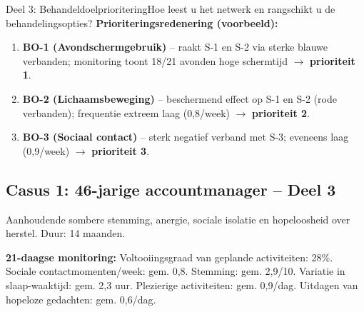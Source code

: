 \documentclass[11pt,a4paper]{article}
\begin{document}
\begin{voorbeeldbox}{Deel 3: Behandeldoelprioritering}{Hoe leest u het netwerk en rangschikt u de behandelingsopties?}
\medskip
\textbf{Prioriteringsredenering (voorbeeld):}
\begin{enumerate}[topsep=2pt,itemsep=1pt,label=\arabic*.]
\item \textbf{BO-1 (Avondschermgebruik)} -- raakt S-1 en S-2 via sterke blauwe verbanden;
monitoring toont 18/21 avonden hoge schermtijd $\rightarrow$ \textbf{prioriteit 1}.
\item \textbf{BO-2 (Lichaamsbeweging)} -- beschermend effect op S-1 en S-2 (rode verbanden);
frequentie extreem laag (0,8/week) $\rightarrow$ \textbf{prioriteit 2}.
\item \textbf{BO-3 (Sociaal contact)} -- sterk negatief verband met S-3; eveneens laag
(0,9/week) $\rightarrow$ \textbf{prioriteit 3}.
\end{enumerate}
\end{voorbeeldbox}

\vspace{0.5em}

\newpage
\subsection*{Casus 1: 46-jarige accountmanager -- Deel 3}

\begin{complaintbox}[title={Casus 1: 46-jarige accountmanager}]
\small Aanhoudende sombere stemming, anergie, sociale isolatie en hopeloosheid over herstel. Duur: 14 maanden.
\end{complaintbox}

\begin{monitorbox}
\small\textbf{21-daagse monitoring:} Voltooiingsgraad van geplande activiteiten: 28\%. Sociale contactmomenten/week: gem. 0,8. Stemming: gem. 2,9/10. Variatie in slaap-waaktijd: gem. 2,3 uur. Plezierige activiteiten: gem. 0,9/dag. Uitdagen van hopeloze gedachten: gem. 0,6/dag.
\end{monitorbox}
\end{document}
